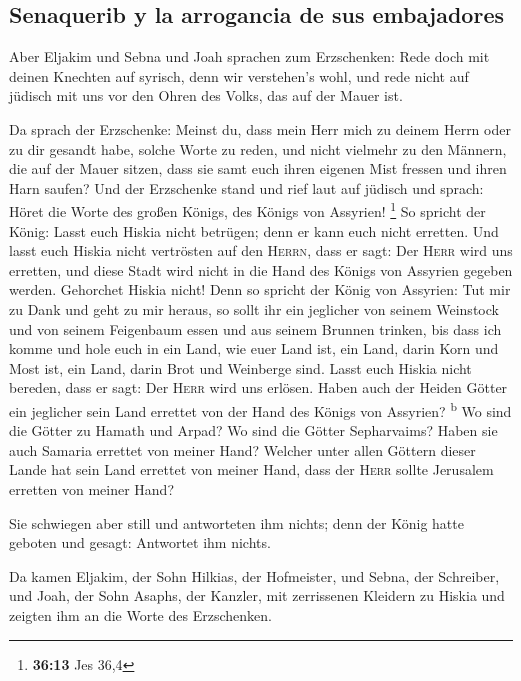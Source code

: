 \hypertarget{senaquerib-y-la-arrogancia-de-sus-embajadores}{%
\subsection{Senaquerib y la arrogancia de sus
embajadores}\label{senaquerib-y-la-arrogancia-de-sus-embajadores}}

 Aber Eljakim und Sebna und Joah sprachen zum
Erzschenken: Rede doch mit deinen Knechten auf syrisch, denn wir
verstehen's wohl, und rede nicht auf jüdisch mit uns vor den Ohren des
Volks, das auf der Mauer ist.

 Da sprach der Erzschenke: Meinst du, dass mein Herr mich
zu deinem Herrn oder zu dir gesandt habe, solche Worte zu reden, und
nicht vielmehr zu den Männern, die auf der Mauer sitzen, dass sie samt
euch ihren eigenen Mist fressen und ihren Harn saufen? 
Und der Erzschenke stand und rief laut auf jüdisch und sprach: Höret die
Worte des großen Königs, des Königs von Assyrien! \footnote{\textbf{36:13}
  Jes 36,4}  So spricht der König: Lasst euch Hiskia
nicht betrügen; denn er kann euch nicht erretten.  Und
lasst euch Hiskia nicht vertrösten auf den \textsc{Herrn}, dass er sagt:
Der \textsc{Herr} wird uns erretten, und diese Stadt wird nicht in die
Hand des Königs von Assyrien gegeben werden.  Gehorchet
Hiskia nicht! Denn so spricht der König von Assyrien: Tut mir zu Dank
und geht zu mir heraus, so sollt ihr ein jeglicher von seinem Weinstock
und von seinem Feigenbaum essen und aus seinem Brunnen trinken,
 bis dass ich komme und hole euch in ein Land, wie euer
Land ist, ein Land, darin Korn und Most ist, ein Land, darin Brot und
Weinberge sind.  Lasst euch Hiskia nicht bereden, dass er
sagt: Der \textsc{Herr} wird uns erlösen. Haben auch der Heiden Götter
ein jeglicher sein Land errettet von der Hand des Königs von Assyrien?
\textsuperscript{b}  Wo sind die Götter zu Hamath und
Arpad? Wo sind die Götter Sepharvaims? Haben sie auch Samaria errettet
von meiner Hand?  Welcher unter allen Göttern dieser
Lande hat sein Land errettet von meiner Hand, dass der \textsc{Herr}
sollte Jerusalem erretten von meiner Hand?

 Sie schwiegen aber still und antworteten ihm nichts;
denn der König hatte geboten und gesagt: Antwortet ihm nichts.

 Da kamen Eljakim, der Sohn Hilkias, der Hofmeister, und
Sebna, der Schreiber, und Joah, der Sohn Asaphs, der Kanzler, mit
zerrissenen Kleidern zu Hiskia und zeigten ihm an die Worte des
Erzschenken.

